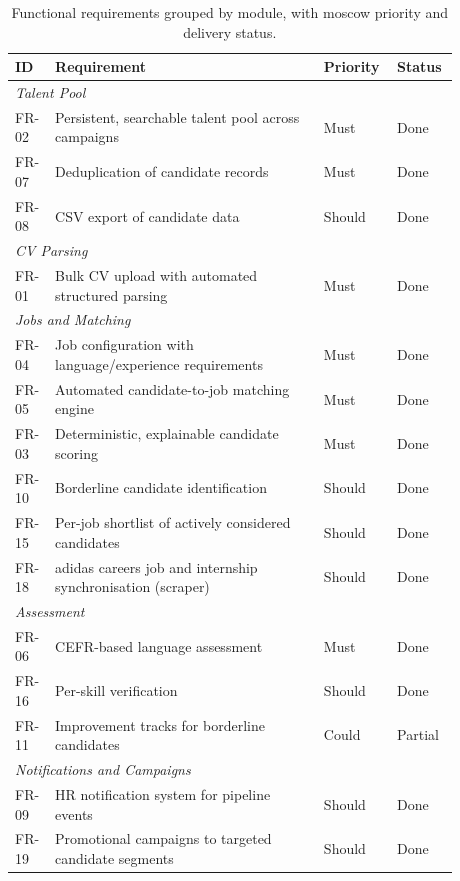 \begin{table}[H]
\centering
\caption[Functional requirements]{Functional requirements grouped by module,
with \gls{moscow} priority and delivery status.}
\label{tab:functional-requirements}
\small
\begin{tabular}{p{0.07\linewidth}p{0.58\linewidth}p{0.13\linewidth}p{0.10\linewidth}}
\toprule
\textbf{ID} & \textbf{Requirement} & \textbf{Priority} & \textbf{Status} \\
\midrule
\multicolumn{4}{l}{\textit{Talent Pool}} \\
FR-02 & Persistent, searchable talent pool across campaigns & Must & Done \\
FR-07 & Deduplication of candidate records & Must & Done \\
FR-08 & CSV export of candidate data & Should & Done \\
\midrule
\multicolumn{4}{l}{\textit{CV Parsing}} \\
FR-01 & Bulk CV upload with automated structured parsing & Must & Done \\
\midrule
\multicolumn{4}{l}{\textit{Jobs and Matching}} \\
FR-04 & Job configuration with language/experience requirements & Must & Done \\
FR-05 & Automated candidate-to-job matching engine & Must & Done \\
FR-03 & Deterministic, explainable candidate scoring & Must & Done \\
FR-10 & Borderline candidate identification & Should & Done \\
FR-15 & Per-job shortlist of actively considered candidates & Should & Done \\
FR-18 & adidas careers job and internship synchronisation (scraper) & Should & Done \\
\midrule
\multicolumn{4}{l}{\textit{Assessment}} \\
FR-06 & CEFR-based language assessment & Must & Done \\
FR-16 & Per-skill verification & Should & Done \\
FR-11 & Improvement tracks for borderline candidates & Could & Partial \\
\midrule
\multicolumn{4}{l}{\textit{Notifications and Campaigns}} \\
FR-09 & HR notification system for pipeline events & Should & Done \\
FR-19 & Promotional campaigns to targeted candidate segments & Should & Done \\

\end{tabular}
\end{table}
